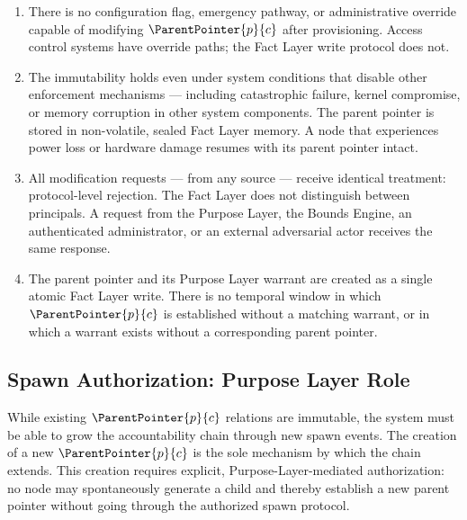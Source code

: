 \begin{enumerate}
    \item[(E1) \textbf{No override path.}] There is no configuration flag, emergency pathway, or administrative override capable of modifying $\ParentPointer{p}{c}$ after provisioning. Access control systems have override paths; the Fact Layer write protocol does not.

    \item[(E2) \textbf{Failure-state resilience.}] The immutability holds even under system conditions that disable other enforcement mechanisms --- including catastrophic failure, kernel compromise, or memory corruption in other system components. The parent pointer is stored in non-volatile, sealed Fact Layer memory. A node that experiences power loss or hardware damage resumes with its parent pointer intact.

    \item[(E3) \textbf{Source-equivalence of enforcement.}] All modification requests --- from any source --- receive identical treatment: protocol-level rejection. The Fact Layer does not distinguish between principals. A request from the Purpose Layer, the Bounds Engine, an authenticated administrator, or an external adversarial actor receives the same response.

    \item[(E4) \textbf{Atomic warrant-pointer creation.}] The parent pointer and its Purpose Layer warrant are created as a single atomic Fact Layer write. There is no temporal window in which $\ParentPointer{p}{c}$ is established without a matching warrant, or in which a warrant exists without a corresponding parent pointer.
\end{enumerate}

\subsection{Spawn Authorization: Purpose Layer Role}
\label{sec:purpose-layer-authorization}

While existing $\ParentPointer{p}{c}$ relations are immutable, the system must be able to grow the accountability chain through new spawn events. The creation of a new $\ParentPointer{p}{c}$ is the sole mechanism by which the chain extends. This creation requires explicit, Purpose-Layer-mediated authorization: no node may spontaneously generate a child and thereby establish a new parent pointer without going through the authorized spawn protocol.

